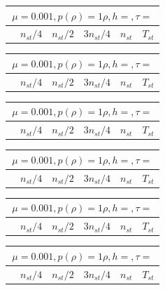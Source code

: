 \begin{tabular}{*{6}{|l}|}
    \hline
     \\
    \hline
    &$n_{st}/4 $&$ n_{st}/2$&$3n_{st}/4$&$n_{st}$&$T_{st}$ \\
    \hline
\end{tabular}

\begin{tabular}{*{6}{|l}|}
    \hline
     \\
    \hline
    &$n_{st}/4 $&$ n_{st}/2$&$3n_{st}/4$&$n_{st}$&$T_{st}$ \\
    \hline
\end{tabular}

\begin{tabular}{*{6}{|l}|}
    \hline
     \\
    \hline
    &$n_{st}/4 $&$ n_{st}/2$&$3n_{st}/4$&$n_{st}$&$T_{st}$ \\
    \hline
\end{tabular}

\begin{tabular}{*{6}{|l}|}
    \hline
     \\
    \hline
    &$n_{st}/4 $&$ n_{st}/2$&$3n_{st}/4$&$n_{st}$&$T_{st}$ \\
    \hline
\end{tabular}

\begin{tabular}{*{6}{|l}|}
    \hline
     \\
    \hline
    &$n_{st}/4 $&$ n_{st}/2$&$3n_{st}/4$&$n_{st}$&$T_{st}$ \\
    \hline
\end{tabular}

\begin{tabular}{*{6}{|l}|}
    \hline
     \\
    \hline
    &$n_{st}/4 $&$ n_{st}/2$&$3n_{st}/4$&$n_{st}$&$T_{st}$ \\
    \hline
\end{tabular}

